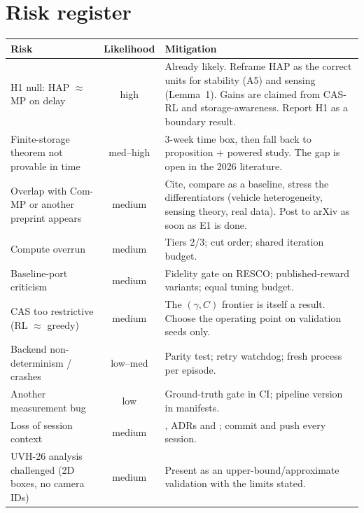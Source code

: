 \documentclass[11pt,a4paper]{article}
\newcommand{\file}[1]{\texttt{\detokenize{#1}}}
\begin{document}
\section{Risk register}
\small
\begin{tabularx}{\textwidth}{@{}p{4.6cm}cX@{}}
\toprule
Risk & Likelihood & Mitigation \\
\midrule
H1 null: HAP $\approx$ MP on delay & high & Already likely. Reframe HAP as the correct
  units for stability (A5) and sensing (Lemma~1). Gains are claimed from CAS-RL and
  storage-awareness. Report H1 as a boundary result. \\
Finite-storage theorem not provable in time & med--high & 3-week time box, then fall back
  to proposition + powered study. The gap is open in the 2026 literature. \\
Overlap with Com-MP or another preprint appears & medium & Cite, compare as a baseline,
  stress the differentiators (vehicle heterogeneity, sensing theory, real data). Post to
  arXiv as soon as E1 is done. \\
Compute overrun & medium & Tiers 2/3; cut order; shared iteration budget. \\
Baseline-port criticism & medium & Fidelity gate on RESCO; published-reward variants; equal
  tuning budget. \\
CAS too restrictive (RL $\approx$ greedy) & medium & The $(\gamma,C)$ frontier is itself a
  result. Choose the operating point on validation seeds only. \\
Backend non-determinism / crashes & low--med & Parity test; retry watchdog; fresh process
  per episode. \\
Another measurement bug & low & Ground-truth gate in CI; pipeline version in manifests. \\
Loss of session context & medium & \file{STATUS.md}, ADRs and \file{CLAUDE.md}; commit and
  push every session. \\
UVH-26 analysis challenged (2D boxes, no camera IDs) & medium & Present as an
  upper-bound/approximate validation with the limits stated. \\
\bottomrule
\end{tabularx}
\normalsize

\end{document}
